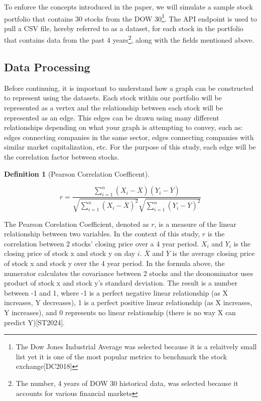 \documentclass{article}
\newtheorem{definition}[theorem]{Definition}
\begin{document}
To enforce the concepts introduced in the paper, we will simulate a sample stock portfolio that contains 30 stocks from the DOW 30\footnote{The Dow Jones Industrial Average was selected because it is a relaitvely small list yet it is one of the most popular metrics to benchmark the stock exchange[DC2018]}. The API endpoint is used to pull a CSV file, hereby referred to as a dataset, for each stock in the portfolio that contains data from the past 4 years\footnote{The number, 4 years of DOW 30 historical data, was selected because it accounts for various financial markets}, along with the fields mentioned above.

\subsection{Data Processing}

Before continuing, it is important to understand how a graph can be constructed to represent using the datasets. Each stock within our portfolio will be represented as a vertex and the relationship between each stock will be represented as an edge. This edges can be drawn using many different relationships depending on what your graph is attempting to convey, such as: edges connecting companies in the same sector, edges connecting companies with similar market capitalization, etc. For the purpose of this study, each edge will be the correlation factor between stocks.

\begin{definition}[Pearson Correlation Coefficent]
\end{definition}

\[
r = \frac{\sum_{i=1}^n (X_i - \overline{X})(Y_i - \overline{Y})}{\sqrt{\sum_{i=1}^n (X_i - \overline{X})^2} \sqrt{\sum_{i=1}^n (Y_i - \overline{Y})^2}}
\]

The Pearson Corelation Coefficient, denoted as $r$, is a measure of the linear relationship between two variables. In the context of this study, $r$ is the correlation between 2 stocks' closing price over a 4 year period. $X_i$ and $Y_i$ is the closing price of stock x and stock y on day $i$. $\overline{X}$ and $\overline{Y}$ is the average closing price of stock x and stock y over the 4 year period. In the formula above, the numerator calculates the covariance between 2 stocks and the deonominator uses product of stock x and stock y's standard deviation. The result is a number between -1 and 1, where -1 is a perfect negative linear relationship (as X increases, Y decreases), 1 is a perfect positive linear relationship (as X increases, Y increases), and 0 represents no linear relationship (there is no way X can predict Y)[ST2024]. 
\end{document}
